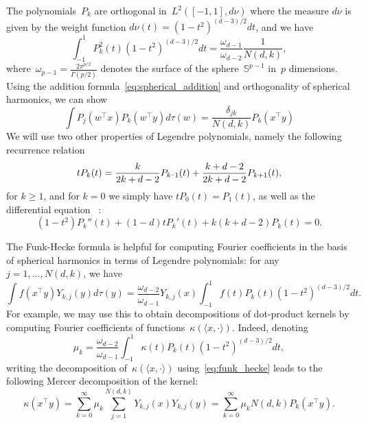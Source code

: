 The polynomials~$P_k$ are orthogonal in~$L^2([-1, 1], d\nu)$ where the measure $d \nu$ is given by the weight function
$d \nu(t) = (1 - t^2)^{(d-3)/2}dt$, and we have
\begin{equation}
\label{eq:legendre_norm}
\int_{-1}^1 P_k^2(t) (1 - t^2)^{(d-3)/2}dt = \frac{\omega_{d-1}}{\omega_{d-2}} \frac{1}{N(d,k)},
\end{equation}
where~$\omega_{p-1} = \frac{2 \pi^{p/2}}{\Gamma(p/2)}$ denotes the surface of the sphere~$\mathbb S^{p-1}$ in~$p$ dimensions.
Using the addition formula~\eqref{eq:spherical_addition} and orthogonality of spherical harmonics, we can show
\begin{equation}
\label{eq:legendre_dp}
\int P_j( w^\top x ) P_k( w^\top y ) d \tau(w) = \frac{\delta_{jk}}{N(d,k)} P_k( x^\top y )
\end{equation}
We will use two other properties of Legendre polynomials, namely the following recurrence relation~\cite[Eq. 4.36]{costas2014spherical}
\begin{equation}
\label{eq:legendre_rec}
t P_k(t) = \frac{k}{2k + d - 2} P_{{k\text{--}1}}(t) + \frac{k + d - 2}{2k + d - 2} P_{k+1}(t),
\end{equation}
for $k \geq 1$, and for $k = 0$ we simply have $t P_0(t) = P_1(t)$, as well as the differential equation
~\citep[see, \eg,][Proposition 4.20]{costas2014spherical}:
\begin{equation}
\label{eq:pk_ode}
(1 - t^2) P_k''(t) + (1 - d) t P_k'(t) + k(k + d - 2) P_k(t) = 0.
\end{equation}

The Funk-Hecke formula is helpful for computing Fourier coefficients in the basis of spherical harmonics in terms of
Legendre polynomials: for any~$j = 1, \ldots, N(d, k)$, we have
\begin{equation}
\label{eq:funk_hecke}
\int f(x^\top y) Y_{k,j}(y) d \tau(y) = \frac{\omega_{d-2}}{\omega_{d-1}} Y_{k,j}(x) \int_{-1}^1 f(t) P_k(t) (1 - t^2)^{(d-3)/2} dt.
\end{equation}
For example, we may use this to obtain decompositions of dot-product kernels by computing Fourier coefficients of functions~$\kappa(\langle x, \cdot \rangle)$.
Indeed, denoting
\begin{equation*}
\mu_k = \frac{\omega_{d-2}}{\omega_{d-1}} \int_{-1}^1 \kappa(t) P_k(t) (1 - t^2)^{(d-3)/2}dt,
\end{equation*}
writing the decomposition of~$\kappa(\langle x, \cdot \rangle)$ using~\eqref{eq:funk_hecke} leads to the following Mercer decomposition of the kernel:
\begin{equation}
\label{eq:mercer}
\kappa(x^\top y) = \sum_{k=0}^\infty \mu_k \sum_{j=1}^{N(d,k)} Y_{k,j}(x) Y_{k,j}(y) = \sum_{k=0}^\infty \mu_k N(d,k) P_k(x^\top y).
\end{equation}


